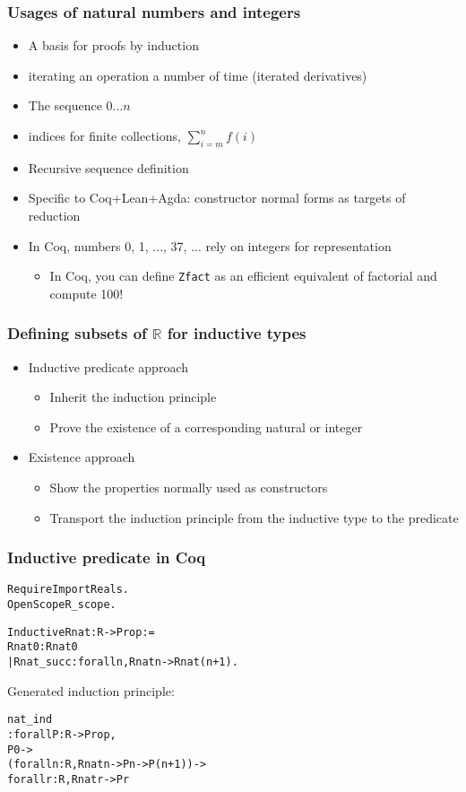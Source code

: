 \documentclass[compress]{beamer}
\begin{document}
\begin{frame}
\frametitle{Usages of natural numbers and integers}
\begin{itemize}
\item A basis for proofs by induction
\item iterating an operation a number of time (iterated derivatives)
\item The sequence \(0\ldots n\)
\item indices for finite collections, \(\sum_{i=m}^{n} f(i)\)
\item Recursive sequence definition
\item Specific to Coq+Lean+Agda: constructor normal forms as targets of
reduction
\item In Coq, numbers 0, 1, ..., 37, ... rely on integers for representation
\begin{itemize}
\item In Coq, you can define {\tt Zfact} as an efficient equivalent of factorial and compute 100!
\end{itemize}
\end{itemize}
\end{frame}
\begin{frame}
\frametitle{Defining subsets of \(\mathbb R\) for inductive types}
\begin{itemize}
\item Inductive predicate approach
\begin{itemize}
\item Inherit the induction principle
\item Prove the existence of a corresponding natural or integer
\end{itemize}
\item Existence approach
\begin{itemize}
\item Show the properties normally used as constructors
\item Transport the induction principle from the inductive type to the predicate
\end{itemize}
\end{itemize}
\end{frame}
\begin{frame}[fragile]
\frametitle{Inductive predicate in Coq}
\begin{alltt}
Require Import Reals.
Open Scope R_scope.

Inductive Rnat : R -> Prop :=
  Rnat0 : Rnat 0
| Rnat_succ : forall n, Rnat n -> Rnat (n + 1).
\end{alltt}
Generated induction principle:
\begin{alltt}
nat_ind
     : forall P : R -> Prop,
       P 0 ->
       (forall n : R, Rnat n -> P n -> P (n + 1)) ->
       forall r : R, Rnat r -> P r
\end{alltt}
\end{frame}
\end{document}
